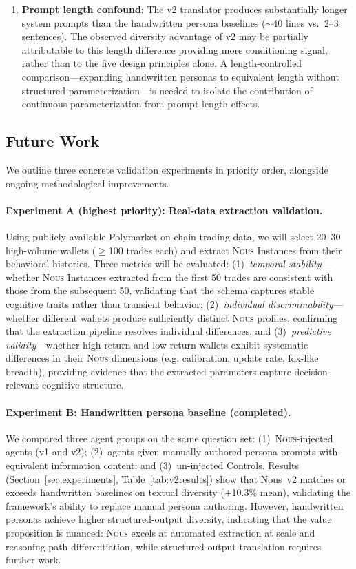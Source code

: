 \documentclass[11pt]{article}
\newcommand{\nous}{\textsc{Nous}}
\newcommand{\eg}{e.g.}
\begin{document}
\begin{enumerate}[leftmargin=*,itemsep=1pt]
    \item \textbf{Prompt length confound}: The v2 translator produces substantially longer system prompts than the handwritten persona baselines ($\sim$40 lines vs.\ 2--3 sentences). The observed diversity advantage of v2 may be partially attributable to this length difference providing more conditioning signal, rather than to the five design principles alone. A length-controlled comparison---expanding handwritten personas to equivalent length without structured parameterization---is needed to isolate the contribution of continuous parameterization from prompt length effects.
\end{enumerate}

\subsection{Future Work}

We outline three concrete validation experiments in priority order, alongside ongoing methodological improvements.

\paragraph{Experiment A (highest priority): Real-data extraction validation.}
Using publicly available Polymarket on-chain trading data, we will select 20--30 high-volume wallets ($\geq$100 trades each) and extract \nous{} Instances from their behavioral histories. Three metrics will be evaluated: (1)~\emph{temporal stability}---whether \nous{} Instances extracted from the first 50 trades are consistent with those from the subsequent 50, validating that the schema captures stable cognitive traits rather than transient behavior; (2)~\emph{individual discriminability}---whether different wallets produce sufficiently distinct \nous{} profiles, confirming that the extraction pipeline resolves individual differences; and (3)~\emph{predictive validity}---whether high-return and low-return wallets exhibit systematic differences in their \nous{} dimensions (\eg{} calibration, update rate, fox-like breadth), providing evidence that the extracted parameters capture decision-relevant cognitive structure.

\paragraph{Experiment B: Handwritten persona baseline (completed).}
We compared three agent groups on the same question set: (1)~\nous{}-injected agents (v1 and v2); (2)~agents given manually authored persona prompts with equivalent information content; and (3)~un-injected Controls. Results (Section~\ref{sec:experiments}, Table~\ref{tab:v2results}) show that Nous~v2 matches or exceeds handwritten baselines on textual diversity (+10.3\% mean), validating the framework's ability to replace manual persona authoring. However, handwritten personas achieve higher structured-output diversity, indicating that the value proposition is nuanced: \nous{} excels at automated extraction at scale and reasoning-path differentiation, while structured-output translation requires further work.
\end{document}
